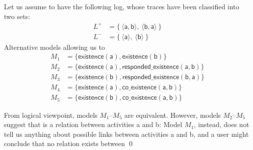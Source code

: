 \begin{example}
\label{ex:unaryVsBinary}
Let us assume %
 to have the following log, whose traces have been classified into two sets:
%
\begin{align*}
L^+ & = \{\ \langle \mathsf{a}, \mathsf{b}\rangle,\ \langle \mathsf{b}, \mathsf{a} \rangle \ \} \\
L^- & = \{\ \langle \mathsf{a}\rangle,\ \langle \mathsf{b} \rangle \ \}
\end{align*}
%
Alternative models allowing us to %
\begin{align*}
M_1 & = \{ \mathsf{existence(a),existence(b)}\} \\
M_2 & = \{ \mathsf{existence(a), responded\_existence(a, b)}\} \\
M_3 & = \{ \mathsf{existence(b), responded\_existence(b, a)}\} \\
M_4 & = \{ \mathsf{existence(a), co\_existence(a, b)}\} \\
M_5 & = \{ \mathsf{existence(b), co\_existence(a, b)}\}
\end{align*}
%

From  %
 logical viewpoint, models $M_1$--$M_5$ %
 are equivalent. However, models  $M_2$--$M_5$ %
 suggest that  
 is a relation between activities \textsf{a} and \textsf{b}: %
 Model $M_1$, %
 instead, does not tell us anything about possible links between activities \textsf{a} and \textsf{b}, and a user might conclude that no relation exists between %
\qed
\end{example}

